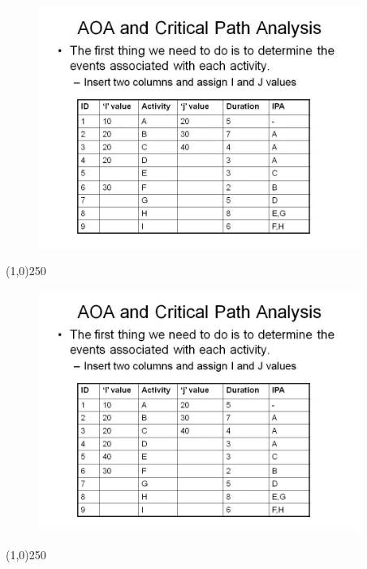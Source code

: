 \begin{frame}
\begin{figure}
	\centering
		\includegraphics[width = 10.5cm]{oldnotes/Slide67.jpg}
\end{figure}
\end{frame}
\begin{center}\line(1,0){250}\end{center}


\begin{frame}
\begin{figure}
	\centering
		\includegraphics[width = 10.5cm]{oldnotes/Slide68.jpg}
\end{figure}
\end{frame}
\begin{center}\line(1,0){250}\end{center}


